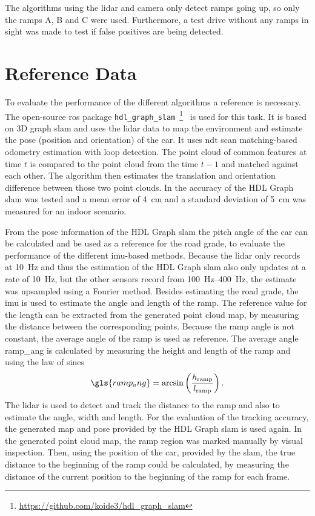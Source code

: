 The algorithms using the \gls{lidar} and camera only detect ramps going up, so only the ramps A, B and C were used.
Furthermore, a test drive without any ramps in sight was made to test if false positives are being detected.



\section{Reference Data}
To evaluate the performance of the different algorithms a reference is necessary.
The open-source \gls{ros} package \texttt{hdl\_graph\_slam}~\footnote{\url{https://github.com/koide3/hdl_graph_slam}}~\cite{Koide2019} is used for this task.
It is based on 3D graph \gls{slam} and uses the \gls{lidar} data to map the environment and estimate the pose (position and orientation) of the car.
It uses \gls{ndt} scan matching-based odometry estimation with loop detection.
The point cloud of common features at time $t$ is compared to the point cloud from the time $t-1$ and matched against each other.
The algorithm then estimates the translation and orientation difference between those two point clouds.
In \cite{Akpnar2021} the accuracy of the HDL Graph \gls{slam} was tested and a mean error of \SI{4}{\cm} and a standard deviation of \SI{5}{\cm} was measured for an indoor scenario.

From the pose information of the HDL Graph \gls{slam} the pitch angle of the car can be calculated and be used as a reference for the road grade, to evaluate the performance of the different \gls{imu}-based methods.
Because the \gls{lidar} only records at \SI{10}{\hertz} and thus the estimation of the HDL Graph \gls{slam} also only updates at a rate of \SI{10}{\hertz}, but the other sensors record from \SIrange{100}{400}{\hertz}, the estimate was upsampled using a Fourier method.
Besides estimating the road grade, the \gls{imu} is used to estimate the angle and length of the ramp.
The reference value for the length can be extracted from the generated point cloud map, by measuring the distance between the corresponding points.
Because the ramp angle is not constant, the average angle of the ramp is used as reference.
The average angle \gls{ramp_ang} is calculated by measuring the height and length of the ramp and using the law of sines
\begin{equation}
    \gls{ramp_ang} = \arcsin\left(\frac{h_\mathrm{ramp}}{l_\mathrm{ramp}}\right).
\end{equation}
The \gls{lidar} is used to detect and track the distance to the ramp and also to estimate the angle, width and length.
For the evaluation of the tracking accuracy, the generated map and pose provided by the HDL Graph \gls{slam} is used again.
In the generated point cloud map, the ramp region was marked manually by visual inspection.
Then, using the position of the car, provided by the \gls{slam}, the true distance to the beginning of the ramp could be calculated, by measuring the distance of the current position to the beginning of the ramp for each frame.

